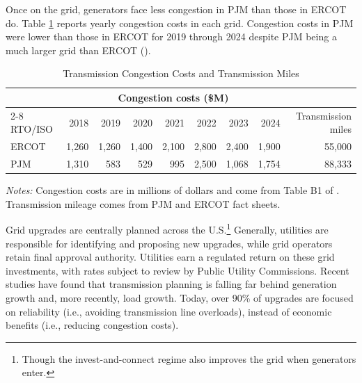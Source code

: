 \documentclass[12pt]{article}
\begin{document}
Once on the grid, generators face less congestion in PJM than those in ERCOT do. Table \ref{tab:congestion-costs} reports yearly congestion costs in each grid. Congestion costs in PJM were lower than those in ERCOT for 2019 through 2024 despite PJM being a much larger grid than ERCOT (\cite{ShreveEtAl2025TransmissionCongestion}). 

\begin{table}[htbp]
\centering
\caption{Transmission Congestion Costs and Transmission Miles}
\label{tab:congestion-costs}
\begin{tabular}{lrrrrrrrr}
\toprule
 & \multicolumn{7}{c}{Congestion costs (\$M)} &  \\
\cmidrule(lr){2-8}
RTO/ISO & 2018 & 2019 & 2020 & 2021 & 2022 & 2023 & 2024 & Transmission miles \\
\midrule
ERCOT & 1{,}260 & 1{,}260 & 1{,}400 & 2{,}100 & 2{,}800 & 2{,}400 & 1{,}900 & 55{,}000 \\
PJM   & 1{,}310 & 583     & 529     & 995     & 2{,}500 & 1{,}068 & 1{,}754 & 88{,}333 \\
\bottomrule
\end{tabular}

\vspace{0.5em}
\begin{minipage}{0.95\textwidth}
\footnotesize \emph{Notes:} Congestion costs are in millions of dollars and come from Table B1 of \citet{ShreveEtAl2025TransmissionCongestion}. Transmission mileage comes from PJM and ERCOT fact sheets.
\end{minipage}
\end{table}

Grid upgrades are centrally planned across the U.S.\footnote{Though the invest-and-connect regime also improves the grid when generators enter.} Generally, utilities are responsible for identifying and proposing new upgrades, while grid operators retain final approval authority. Utilities earn a regulated return on these grid investments, with rates subject to review by Public Utility Commissions. Recent studies have found that transmission planning is falling far behind generation growth and, more recently, load growth. Today, over 90\% of upgrades are focused on reliability (i.e., avoiding transmission line overloads), instead of economic benefits (i.e., reducing congestion costs). 
\end{document}
